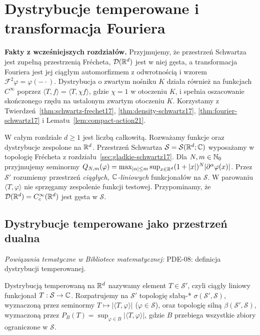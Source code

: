 
\section{Dystrybucje temperowane i transformacja Fouriera}
\label{sec:temperowane22}

\providecommand{\atlasref}[2]{#2}


\noindent\textbf{Fakty z wcześniejszych rozdziałów.}
Przyjmujemy, że przestrzeń Schwartza jest zupełną przestrzenią Frécheta,
$\mathcal D(\mathbb R^d)$ jest w niej gęsta, a transformacja Fouriera
jest jej ciągłym automorfizmem z odwrotnością i wzorem
$\mathcal F^2\varphi=\varphi(-\cdot)$.
Dystrybucja o zwartym nośniku $K$ działa również na funkcjach
$C^\infty$ poprzez $\langle T,f\rangle=\langle T,\chi f\rangle$,
gdzie $\chi=1$ w otoczeniu $K$, i spełnia oszacowanie
skończonego rzędu na ustalonym zwartym otoczeniu $K$.
Korzystamy z Twierdzeń~\ref{thm:schwartz-frechet17},
\ref{thm:density-schwartz17}, \ref{thm:fourier-schwartz17}
i Lematu~\ref{lem:compact-action21}.

W całym rozdziale $d\ge1$ jest liczbą całkowitą.
Rozważamy funkcje oraz dystrybucje zespolone na $\mathbb R^d$.
Przestrzeń Schwartza $\mathcal S=\mathcal S(\mathbb R^d;\mathbb C)$
wyposażamy w topologię Frécheta z rozdziału~\ref{sec:gladkie-schwartz17}.
Dla $N,m\in\mathbb N_0$ przyjmujemy seminormy
$Q_{N,m}(\varphi)=\max_{|\alpha|\le m}\sup_{x\in\mathbb R^d}
(1+|x|)^N|\partial^\alpha\varphi(x)|$.
Przez $\mathcal S'$ rozumiemy przestrzeń \emph{ciągłych,
$\mathbb C$-liniowych} funkcjonałów na $\mathcal S$.
W parowaniu $\langle T,\varphi\rangle$ nie sprzęgamy zespolenie
funkcji testowej. Przypominamy, że
$\mathcal D(\mathbb R^d)=C_c^\infty(\mathbb R^d)$ jest gęsta w $\mathcal S$.

\subsection{Dystrybucje temperowane jako przestrzeń dualna}

\noindent\emph{Powiązania tematyczne w Bibliotece matematycznej:} \atlasref{PDE-08::def:pde8-tempered}{PDE-08: definicja dystrybucji temperowanej}.


\begin{definicja}
\label{def:tempered22}
Dystrybucją temperowaną na $\mathbb R^d$ nazywamy element
$T\in\mathcal S'$, czyli ciągły liniowy funkcjonał
$T:\mathcal S\to\mathbb C$. Rozpatrujemy na $\mathcal S'$ topologię
słabą-* $\sigma(\mathcal S',\mathcal S)$, wyznaczoną przez
seminormy $T\mapsto|\langle T,\varphi\rangle|$
($\varphi\in\mathcal S$), oraz topologię silną
$\beta(\mathcal S',\mathcal S)$, wyznaczoną przez
$P_B(T)=\sup_{\varphi\in B}|\langle T,\varphi\rangle|$,
gdzie $B$ przebiega wszystkie zbiory ograniczone w $\mathcal S$.
\end{definicja}

